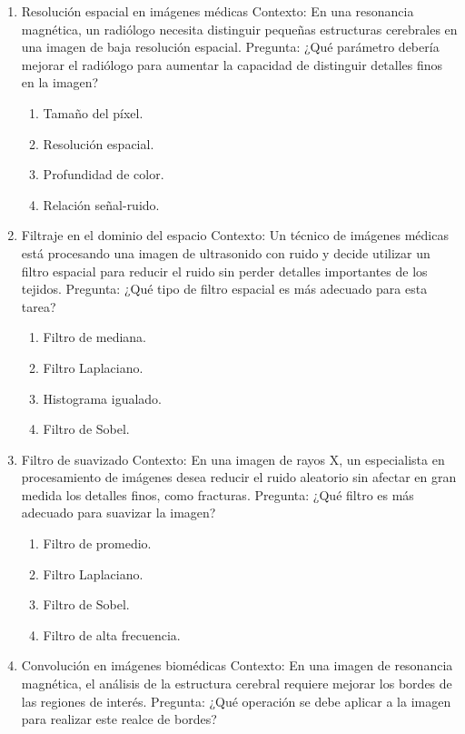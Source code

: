 \documentclass[12pt,a4paper]{article}
\providecommand{\tightlist}{%
  \setlength{\itemsep}{0pt}\setlength{\parskip}{0pt}}\usepackage{longtable,booktabs,array}
\providecommand{\tightlist}{%
  \setlength{\itemsep}{0pt}\setlength{\parskip}{2pt}}
\begin{document}
\setcounter{page}{2} %
\begin{enumerate}
\tightlist
\item
  Resolución espacial en imágenes médicas Contexto: En una resonancia
  magnética, un radiólogo necesita distinguir pequeñas estructuras
  cerebrales en una imagen de baja resolución espacial. Pregunta: ¿Qué
  parámetro debería mejorar el radiólogo para aumentar la capacidad de
  distinguir detalles finos en la imagen?

  \begin{enumerate}
  \tightlist
  \item
    Tamaño del píxel.
  \item
    Resolución espacial.
  \item
    Profundidad de color.
  \item
    Relación señal-ruido.
  \end{enumerate}
\item
  Filtraje en el dominio del espacio Contexto: Un técnico de imágenes
  médicas está procesando una imagen de ultrasonido con ruido y decide
  utilizar un filtro espacial para reducir el ruido sin perder detalles
  importantes de los tejidos. Pregunta: ¿Qué tipo de filtro espacial es
  más adecuado para esta tarea?

  \begin{enumerate}
  \tightlist
  \item
    Filtro de mediana.
  \item
    Filtro Laplaciano.
  \item
    Histograma igualado.
  \item
    Filtro de Sobel.
  \end{enumerate}
\item
  Filtro de suavizado Contexto: En una imagen de rayos X, un
  especialista en procesamiento de imágenes desea reducir el ruido
  aleatorio sin afectar en gran medida los detalles finos, como
  fracturas. Pregunta: ¿Qué filtro es más adecuado para suavizar la
  imagen?

  \begin{enumerate}
  \tightlist
  \item
    Filtro de promedio.
  \item
    Filtro Laplaciano.
  \item
    Filtro de Sobel.
  \item
    Filtro de alta frecuencia.
  \end{enumerate}
\item
  Convolución en imágenes biomédicas Contexto: En una imagen de
  resonancia magnética, el análisis de la estructura cerebral requiere
  mejorar los bordes de las regiones de interés. Pregunta: ¿Qué
  operación se debe aplicar a la imagen para realizar este realce de
  bordes?


\end{enumerate}
\end{document}
